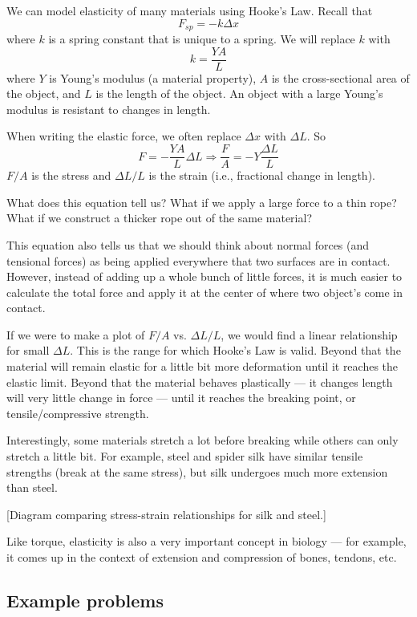 We can model elasticity of many materials using Hooke's Law. Recall that
$$F_{sp}=-k\Delta{x}$$
where $k$ is a spring constant that is unique to a spring. We will replace $k$ with
$$k=\frac{YA}{L}$$
where $Y$ is Young's modulus (a material property), $A$ is the cross-sectional area of the object, and $L$ is the length of the object. An object with a large Young's modulus is resistant to changes in length.

When writing the elastic force, we often replace $\Delta{x}$ with $\Delta{L}$. So
$$F=-\frac{YA}{L}\Delta{L}\Rightarrow \frac{F}{A}=-Y\frac{\Delta{L}}{L}$$
$F/A$ is the stress and $\Delta{L}/L$ is the strain (i.e., fractional change in length).

What does this equation tell us? What if we apply a large force to a thin rope? What if we construct a thicker rope out of the same material?

This equation also tells us that we should think about normal forces (and tensional forces) as being applied everywhere that two surfaces are in contact. However, instead of adding up a whole bunch of little forces, it is much easier to calculate the total force and apply it at the center of where two object's come in contact.

If we were to make a plot of $F/A$ vs. $\Delta{L}/L$, we would find a linear relationship for small $\Delta{L}$. This is the range for which Hooke's Law is valid. Beyond that the material will remain elastic for a little bit more deformation until it reaches the elastic limit. Beyond that the material behaves plastically --- it changes length will very little change in force --- until it reaches the breaking point, or tensile/compressive strength.

\vspace{5cm}

Interestingly, some materials stretch a lot before breaking while others can only stretch a little bit. For example, steel and spider silk have similar tensile strengths (break at the same stress), but silk undergoes much more extension than steel.

[Diagram comparing stress-strain relationships for silk and steel.]
\vspace{5cm}

Like torque, elasticity is also a very important concept in biology --- for example, it comes up in the context of extension and compression of bones, tendons, etc.

\subsection{Example problems}
